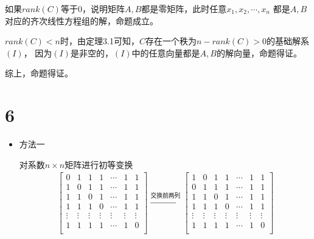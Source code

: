\documentclass{article}
\begin{document}
如果$rank(C)$等于$0$，说明矩阵$A, B$都是零矩阵，此时任意$x_1, x_2, \cdots, x_n$
都是$A, B$对应的齐次线性方程组的解，命题成立。

$rank(C) < n$时，由定理3.1可知，$C$存在一个秩为$n - rank(C) > 0$的基础解系$(I)$，
因为$(I)$是非空的，$(I)$中的任意向量都是$A, B$的解向量，命题得证。

综上，命题得证。

\section*{6}

\begin{itemize}
  \item 方法一

        对系数$n \times n$矩阵进行初等变换
        \begin{align*}
          \begin{bmatrix}
            0      & 1      & 1      & 1      & \cdots & 1      & 1      \\
            1      & 0      & 1      & 1      & \cdots & 1      & 1      \\
            1      & 1      & 0      & 1      & \cdots & 1      & 1      \\
            1      & 1      & 1      & 0      & \cdots & 1      & 1      \\
            \vdots & \vdots & \vdots & \vdots & \vdots & \vdots & \vdots \\
            1      & 1      & 1      & 1      & \cdots & 1      & 0      \\
          \end{bmatrix}
          \xrightarrow{\text{交换前两列}}
          \begin{bmatrix}
            1      & 0      & 1      & 1      & \cdots & 1      & 1      \\
            0      & 1      & 1      & 1      & \cdots & 1      & 1      \\
            1      & 1      & 0      & 1      & \cdots & 1      & 1      \\
            1      & 1      & 1      & 0      & \cdots & 1      & 1      \\
            \vdots & \vdots & \vdots & \vdots & \vdots & \vdots & \vdots \\
            1      & 1      & 1      & 1      & \cdots & 1      & 0      \\
          \end{bmatrix} \\

\end{align*}
\end{itemize}
\end{document}
